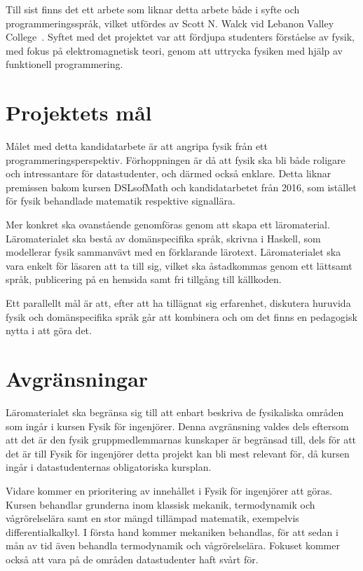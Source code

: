 Till sist finns det ett arbete som liknar detta arbete både i syfte och
programmeringsspråk, vilket utfördes av Scott N. Walck vid Lebanon Valley
College~\cite{lebanon-physics}. Syftet med det projektet var att fördjupa
studenters förståelse av fysik, med fokus på elektromagnetisk teori, genom att
uttrycka fysiken med hjälp av funktionell programmering.

\section{Projektets mål}

Målet med detta kandidatarbete är att angripa fysik från ett
programmeringsperspektiv. Förhoppningen är då att fysik ska bli både
roligare och intressantare för datastudenter, och därmed också
enklare. Detta liknar premissen bakom kursen DSLsofMath och kandidatarbetet
från 2016, som istället för fysik behandlade matematik respektive signallära.

Mer konkret ska ovanstående genomföras genom att skapa ett läromaterial.
Läromaterialet ska bestå av
domänspecifika språk, skrivna
i Haskell, som
modellerar fysik sammanvävt med en förklarande lärotext. Läromaterialet ska vara
enkelt för läsaren att ta till sig, vilket ska åstadkommas genom ett lättsamt
språk, publicering på en hemsida samt fri tillgång till källkoden.

Ett parallellt mål är att, efter att ha tillägnat sig erfarenhet, diskutera
huruvida fysik och domänspecifika språk går att kombinera och om det finns en
pedagogisk nytta i att göra det.

\section{Avgränsningar}\label{sec:avgransningar}

Läromaterialet ska begränsa sig till att enbart beskriva de fysikaliska områden
som ingår i kursen Fysik för ingenjörer. Denna avgränsning valdes dels eftersom
att det är den fysik gruppmedlemmarnas kunskaper är begränsad till, dels för att
det är till Fysik för ingenjörer detta projekt kan bli mest relevant för, då
kursen ingår i datastudenternas obligatoriska kursplan.

Vidare kommer en prioritering av innehållet i Fysik för ingenjörer att göras.
Kursen behandlar grunderna inom klassisk mekanik, termodynamik och
vågrörelselära samt en stor mängd tillämpad matematik, exempelvis
differentialkalkyl. I första hand kommer mekaniken behandlas, för att sedan i mån
av tid även behandla termodynamik och vågrörelselära. Fokuset kommer också att
vara på de områden datastudenter haft svårt för.

